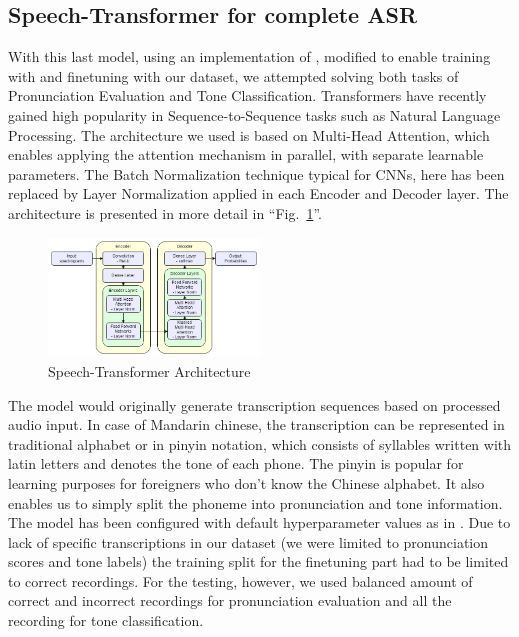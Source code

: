 \documentclass[conference]{IEEEtran}
\begin{document}
\subsection{Speech-Transformer for complete ASR}
With this last model, using an implementation of \cite{vaswani2023attentionneed,8462506}, modified to enable training with \cite{shi2021aishell3multispeakermandarintts} and finetuning with our dataset, we attempted solving both tasks of Pronunciation Evaluation and Tone Classification.
Transformers have recently gained high popularity in Sequence-to-Sequence tasks such as Natural Language Processing. The architecture we used is based on Multi-Head Attention, which enables applying the attention mechanism in parallel, with separate learnable parameters. The Batch Normalization technique typical for CNNs, here has been replaced by Layer Normalization applied in each Encoder and Decoder layer.
The architecture is presented in more detail in ``Fig.~\ref{fig_STArch}''.

\begin{figure}[hbtp]
    \centerline{\includegraphics[width=0.5\textwidth]{Figures/Speech-Transformer.png}}
    \caption{Speech-Transformer Architecture}
    \label{fig_STArch} %
    \end{figure}

The model would originally generate transcription sequences based on processed audio input. In case of Mandarin chinese, the transcription can be represented in traditional alphabet or in pinyin notation, which consists of syllables written with latin letters and denotes the tone of each phone.
The pinyin is popular for learning purposes for foreigners who don't know the Chinese alphabet. It also enables us to simply split the phoneme into pronunciation and tone information.
The model has been configured with default hyperparameter values as in \cite{8462506}. Due to lack of specific transcriptions in our dataset (we were limited to pronunciation scores and tone labels) the training split for the finetuning part had to be limited to correct recordings. %
For the testing, however, we used balanced amount of correct and incorrect recordings for pronunciation evaluation and all the recording for tone classification.
\end{document}
